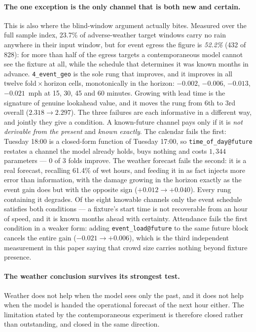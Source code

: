 \documentclass[letterpaper]{article}
\begin{document}
\paragraph{The one exception is the only channel that is both new and certain.} This is also where the blind-window argument actually bites. Measured over the full sample index, 23.7\% of adverse-weather target windows carry no rain anywhere in their input window, but for event egress the figure is \emph{52.2\%} (432 of 828): for more than half of the egress targets a contemporaneous model cannot see the fixture at all, while the schedule that determines it was known months in advance. \texttt{4\_event\_geo} is the sole rung that improves, and it improves in all twelve fold\,$\times$\,horizon cells, monotonically in the horizon: $-0.002$, $-0.006$, $-0.013$, $-0.021$~mph at 15, 30, 45 and 60 minutes. Growing with lead time is the signature of genuine lookahead value, and it moves the rung from 6th to 3rd overall ($2.318\to2.297$). The three failures are each informative in a different way, and jointly they give a condition. A known-future channel pays only if it is \emph{not derivable from the present} and \emph{known exactly}. The calendar fails the first: Tuesday 18:00 is a closed-form function of Tuesday 17:00, so \texttt{time\_of\_day@future} restates a channel the model already holds, buys nothing and costs $1{,}344$ parameters --- 0 of 3 folds improve. The weather forecast fails the second: it is a real forecast, recalling 61.4\% of wet hours, and feeding it in as fact injects more error than information, with the damage growing in the horizon exactly as the event gain does but with the opposite sign ($+0.012\to+0.040$). Every rung containing it degrades. Of the eight knowable channels only the event schedule satisfies both conditions --- a fixture's start time is not recoverable from an hour of speed, and it is known months ahead with certainty. Attendance fails the first condition in a weaker form: adding \texttt{event\_load@future} to the same future block cancels the entire gain ($-0.021\to+0.006$), which is the third independent measurement in this paper saying that crowd size carries nothing beyond fixture presence.

\paragraph{The weather conclusion survives its strongest test.} Weather does not help when the model sees only the past, and it does not help when the model is handed the operational forecast of the next hour either. The limitation stated by the contemporaneous experiment is therefore closed rather than outstanding, and closed in the same direction.
\end{document}
